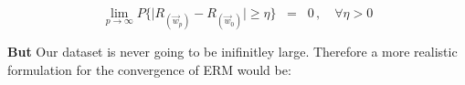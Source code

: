 {\begin{frame}
\begin{itemize}
			\end{itemize}
			
			\begin{equation}
				\lim_{p \to \infty} P\bigg\{ 
					{
						\Big|R_{(\vec w_p)} - R_{(\vec w_0)}\Big| 
					}
				\geq \eta \bigg\}\;\;=\;\; 0 \,, \quad \forall \eta > 0
				\label{eq:risktozero}
			\end{equation}
			
			\textbf{But} Our dataset is never going to be inifinitley large. Therefore a more realistic formulation for the convergence of ERM would be:
\end{frame}
}
